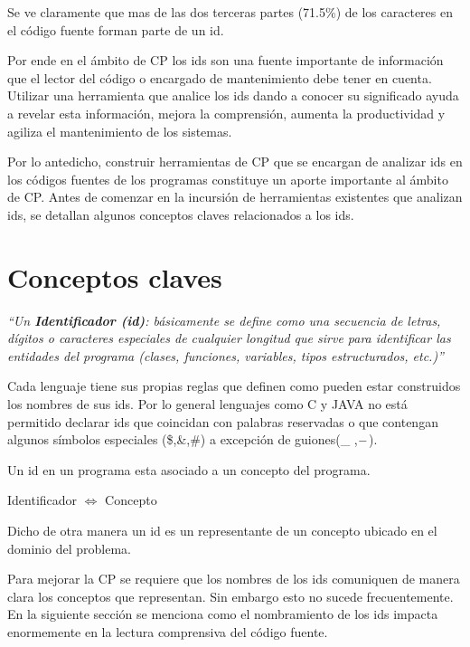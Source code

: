 \documentclass[a4paper,12pt]{report}
\begin{document}
Se ve claramente que mas de las dos terceras partes (71.5\%) de los caracteres en el código fuente forman parte de un id\cite{DFPM05,DMDJ13}. 

Por ende en el ámbito de CP los ids son una fuente importante de información que el lector del código o encargado de mantenimiento debe tener en cuenta. Utilizar una herramienta que analice los ids dando a conocer su significado ayuda a revelar esta información, mejora la comprensión, aumenta la productividad y agiliza el mantenimiento de los sistemas.

Por lo antedicho, construir herramientas de CP que se encargan de analizar ids en los códigos fuentes de los programas constituye un aporte importante al ámbito de CP. Antes de comenzar en la incursión de herramientas existentes que analizan ids, se detallan algunos conceptos claves relacionados a los ids.

\section{Conceptos claves}

\textit{“Un \textbf{Identificador (id)}: básicamente se define como una secuencia de letras, dígitos o caracteres especiales de cualquier longitud que sirve para identificar las entidades del programa (clases, funciones, variables, tipos estructurados, etc.)”}
 
Cada lenguaje tiene sus propias reglas que definen como pueden estar construidos los nombres de sus ids. Por lo general lenguajes como C y JAVA no está permitido declarar ids que coincidan con palabras reservadas o que contengan algunos símbolos especiales (\$,\&,\#) a excepción de guiones(\_ ,$\--$).

Un id en un programa esta asociado a un concepto del programa. 

\begin{center}
\textsf{Identificador $\Leftrightarrow$ Concepto}
\end{center}

Dicho de otra manera un id es un representante de un concepto ubicado en el dominio del problema\cite{DFPM05,DMDJ13}.%

Para mejorar la CP se requiere que los nombres de los ids comuniquen de manera clara los conceptos que representan\cite{DFPM05,DLHD06,DCHD06}. Sin embargo esto no sucede frecuentemente. En la siguiente sección se menciona como el nombramiento de los ids impacta enormemente en la lectura comprensiva del código fuente.
\end{document}
